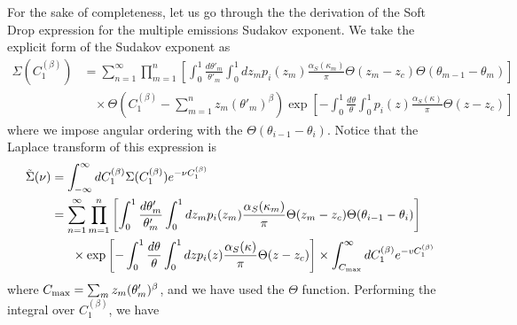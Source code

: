 
For the sake of completeness, let us go through the the derivation of the Soft Drop expression for the multiple emissions Sudakov exponent. We take the explicit form of the Sudakov exponent as
\begin{align}
    \Sigma\left(C_1^{(\beta)}\right) &= \sum_{n = 1}^\infty \prod_{m = 1}^n \left[\int_0^{1} \frac{d\theta'_m}{\theta'_m}\int_0^1 dz_m p_i(z_m) \frac{\alpha_S(\kappa_m)}{\pi}\Theta(z_m - z_c) \Theta(\theta_{m-1} - \theta_m)\right]
    \\
    &\ \ \ \ \times\Theta\left(C_1^{(\beta)} - \sum_{m=1}^n z_m (\theta'_m)^\beta\right) \exp\left[-\int_0^1\frac{d\theta}{\theta}\int_0^1 p_i(z) \frac{\alpha_S(\kappa)}{\pi}\Theta(z - z_c)\right]
\end{align}
where we impose angular ordering with the \(\Theta(\theta_{i-1} - \theta_i)\). Notice that the Laplace transform of this expression is
\begin{align}
    \tilde\Sigma(\nu) &= \int_{-\infty}^\infty d C_1^{(\beta)} \Sigma(C_1^{(\beta)}) e^{-\nu C_1^{(\beta)}}
    \\
    &= \sum_{n=1}^\infty \prod_{m=1}^n  \left[\int_0^{1} \frac{d\theta'_m}{\theta'_m}\int_0^1 dz_m p_i(z_m) \frac{\alpha_S(\kappa_m)}{\pi}\Theta(z_m - z_c) \Theta(\theta_{i-1} - \theta_i)\right]\\
    &\ \ \ \ \ \times \exp\left[-\int_0^1\frac{d\theta}{\theta}\int_0^1 dz p_i(z) \frac{\alpha_S(\kappa)}{\pi}\Theta(z - z_c)\right] \times\int^\infty_{C_{\rm max}} dC_1^{(\beta)} e^{-v C_1^{(\beta)}}
\end{align}
where \(C_{\rm max} = \sum_m z_m (\theta'_m)^\beta\), and we have used the \(\Theta\) function. Performing the integral over \(C_1^{(\beta)}\), we have
